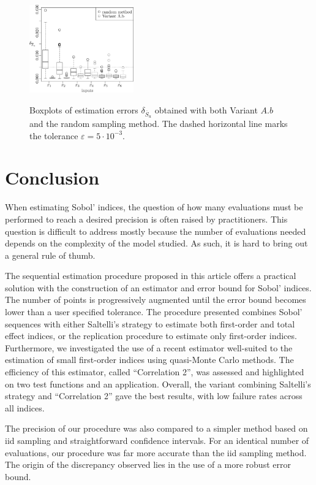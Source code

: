 {\begin{figure}[t]
\caption{Boxplots of estimation errors $\delta_{\overline{S}_u}$ obtained with both Variant $A.b$ and the random sampling method. The dashed horizontal line marks the tolerance $\varepsilon=5\cdot 10^{-3}$.}
\centering
\vspace*{0.2cm}
\includegraphics[width=0.4\textwidth]{comp_mc_tot.eps}
\label{compa_MC_tot}
\end{figure}}


\section{Conclusion}
When estimating Sobol' indices, the question of how many evaluations must be performed to reach a desired precision is often raised by practitioners. This question is difficult to address mostly because the number of evaluations needed depends on the complexity of the model studied. As such, it is hard to bring out a general rule of thumb. 

The sequential estimation procedure proposed in this article offers a practical solution with the construction of an estimator and error bound for Sobol' indices. The number of points is progressively augmented until the error bound becomes lower than a user specified tolerance. The procedure presented combines Sobol' sequences with either Saltelli's strategy to estimate both first-order and total effect indices, or the replication procedure to estimate only first-order indices. Furthermore, we investigated the use of a recent estimator well-suited to the estimation of small first-order indices using quasi-Monte Carlo methods. The efficiency of this estimator, called ``Correlation 2'', was assessed and highlighted on two test functions and an application. Overall, the variant combining Saltelli's strategy and ``Correlation 2'' gave the best results, with low failure rates across all indices.

{\color{purple} The precision of our procedure was also compared to a simpler method based on iid sampling and straightforward confidence intervals. For an identical number of evaluations, our procedure was far more accurate than the iid sampling method. The origin of the discrepancy observed lies in the use of a more robust error bound.}

